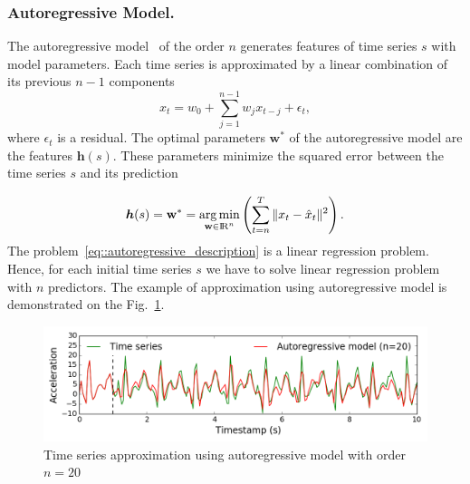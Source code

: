 \documentclass{llncs}
\DeclareMathOperator*{\argmin}{arg\,min}
\begin{document}
\subsubsection{Autoregressive Model.}
The autoregressive model~\cite{lukashin2003adaptive} of the order $n$ generates features of time series $s$ with model parameters. 
Each time series is approximated by a linear combination of its previous $n-1$ components 
\begin{equation*}
x_t = w_0 + \sum_{j=1}^{n-1} w_j x_{t-j} + \epsilon_t,
\end{equation*}
where $\epsilon_t$ is a residual. 
The optimal parameters $\mathbf{w}^*$ of the autoregressive model are the features $\bm{h}(s)$.
These parameters minimize the squared error between the time series $s$ and its prediction

\begin{equation}
\bm{h}(s) = \mathbf{w}^* = \argmin_{\mathbf{w} \in \bbbr^{n}} \left( \sum_{t=n}^{T} \|x_t - \hat{x}_t\|^2\right).
\label{eq::autoregressive_description}
\end{equation}
The problem~\eqref{eq::autoregressive_description} is a linear regression problem. Hence, for each initial time series $s$ we have to solve linear regression problem with $n$ predictors.
The example of approximation using autoregressive model is demonstrated on the Fig.~\ref{fig::ar_example}.

\begin{figure}[h]
	\centering
	\includegraphics[width=1\linewidth]{pics/ar_example.png}
	\caption{Time series approximation using autoregressive model with order $n = 20$}
	\label{fig::ar_example}
\end{figure}
\end{document}
